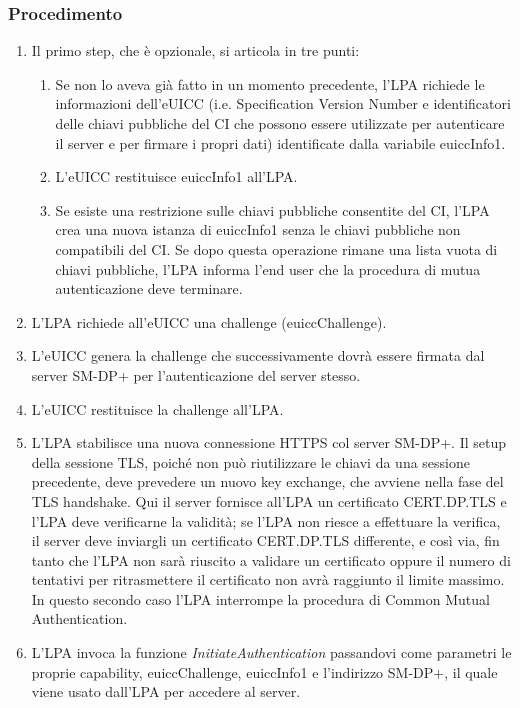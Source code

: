 \documentclass[10pt, oneside]{book}
\begin{document}
\subsubsection{Procedimento}
\begin{enumerate}
\item Il primo step, che è opzionale, si articola in tre punti:
\begin{enumerate}[label=\alph*)]
\item Se non lo aveva già fatto in un momento precedente, l'LPA richiede le informazioni dell'eUICC (i.e. Specification Version Number e identificatori delle chiavi pubbliche del CI che possono essere utilizzate per autenticare il server e per firmare i propri dati) identificate dalla variabile euiccInfo1.
\item L'eUICC restituisce euiccInfo1 all'LPA.
\item Se esiste una restrizione sulle chiavi pubbliche consentite del CI, l'LPA crea una nuova istanza di euiccInfo1 senza le chiavi pubbliche non compatibili del CI. Se dopo questa operazione rimane una lista vuota di chiavi pubbliche, l'LPA informa l'end user che la procedura di mutua autenticazione deve terminare.
\end{enumerate}
\item L'LPA richiede all'eUICC una challenge (euiccChallenge).
\item L'eUICC genera la challenge che successivamente dovrà essere firmata dal server SM-DP+ per l'autenticazione del server stesso.
\item L'eUICC restituisce la challenge all'LPA.
\item L'LPA stabilisce una nuova connessione HTTPS col server SM-DP+. Il setup della sessione TLS, poiché non può riutilizzare le chiavi da una sessione precedente, deve prevedere un nuovo key exchange, che avviene nella fase del TLS handshake. Qui il server fornisce all'LPA un certificato CERT.DP.TLS e l'LPA deve verificarne la validità; se l'LPA non riesce a effettuare la verifica, il server deve inviargli un certificato CERT.DP.TLS differente, e così via, fin tanto che l'LPA non sarà riuscito a validare un certificato oppure il numero di tentativi per ritrasmettere il certificato non avrà raggiunto il limite massimo. In questo secondo caso l'LPA interrompe la procedura di Common Mutual Authentication.
\item L'LPA invoca la funzione \textit{InitiateAuthentication} passandovi come parametri le proprie capability, euiccChallenge, euiccInfo1 e l'indirizzo SM-DP+, il quale viene usato dall'LPA per accedere al server.

\end{enumerate}
\end{document}
